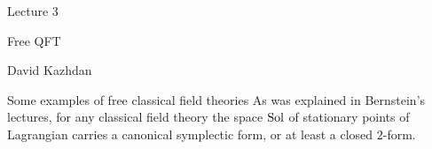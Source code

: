 \def\dbC{{\Bbb C}} 
\def\dbR{{\Bbb R}}
\def\dbZ{{\Bbb Z}} 

\def\gr#1{{\fam\eufmfam\relax#1}}

\def\grA{{\gr A}}	\def\gra{{\gr a}}
\def\grB{{\gr B}}	\def\grb{{\gr b}}
\def\grC{{\gr C}}	\def\grc{{\gr c}}
\def\grD{{\gr D}}	\def\grd{{\gr d}}
\def\grE{{\gr E}}	\def\gre{{\gr e}}
\def\grF{{\gr F}}	\def\grf{{\gr f}}
\def\grG{{\gr G}}	\def\grg{{\gr g}}
\def\grH{{\gr H}}	\def\grh{{\gr h}}
\def\grI{{\gr I}}	\def\gri{{\gr i}}
\def\grJ{{\gr J}}	\def\grj{{\gr j}}
\def\grK{{\gr K}}	\def\grk{{\gr k}}
\def\grL{{\gr L}}	\def\grl{{\gr l}}
\def\grM{{\gr M}}	\def\grm{{\gr m}}
\def\grN{{\gr N}}	\def\grn{{\gr n}}
\def\grO{{\gr O}}	\def\gro{{\gr o}}
\def\grP{{\gr P}}	\def\grp{{\gr p}}
\def\grQ{{\gr Q}}	\def\grq{{\gr q}}
\def\grR{{\gr R}}	\def\grr{{\gr r}}
\def\grS{{\gr S}}	\def\grs{{\gr s}}
\def\grT{{\gr T}}	\def\grt{{\gr t}}
\def\grU{{\gr U}}	\def\gru{{\gr u}}
\def\grV{{\gr V}}	\def\grv{{\gr v}}
\def\grW{{\gr W}}	\def\grw{{\gr w}}
\def\grX{{\gr X}}	\def\grx{{\gr x}}
\def\grY{{\gr Y}}	\def\gry{{\gr y}}
\def\grZ{{\gr Z}}	\def\grz{{\gr z}}


\def\scr#1{{\fam\eusmfam\relax#1}}

\def\scrA{{\scr A}}   \def\scrB{{\scr B}}
\def\scrC{{\scr C}}   \def\scrD{{\scr D}}
\def\scrE{{\scr E}}   \def\scrF{{\scr F}}
\def\scrG{{\scr G}}   \def\scrH{{\scr H}}
\def\scrI{{\scr I}}   \def\scrJ{{\scr J}}
\def\scrK{{\scr K}}   \def\scrL{{\scr L}}
\def\scrM{{\scr M}}   \def\scrN{{\scr N}}
\def\scrO{{\scr O}}   \def\scrP{{\scr P}}
\def\scrQ{{\scr Q}}   \def\scrR{{\scr R}}
\def\scrS{{\scr S}}   \def\scrT{{\scr T}}
\def\scrU{{\scr U}}   \def\scrV{{\scr V}}
\def\scrW{{\scr W}}   \def\scrX{{\scr X}}
\def\scrY{{\scr Y}}   \def\scrZ{{\scr Z}}

\def\gr#1{{\fam\eufmfam\relax#1}}

\def\grg{{\frak g}}
\def\grp{{\frak p}}


\document

\centerline{\bigboldtitlefont Lecture 3}

\bigskip\centerline{\boldtitlefont Free QFT}

\centerline{David Kazhdan}


\dspace
\bigskip\bigskip





 {Some examples of free classical field theories}\endsubhead
As was explained in Bernstein's lectures, for any classical
field theory the space $\text{\rm Sol}$ of stationary points of
Lagrangian carries a canonical symplectic form, or at least 
a closed $2$-form.
 
